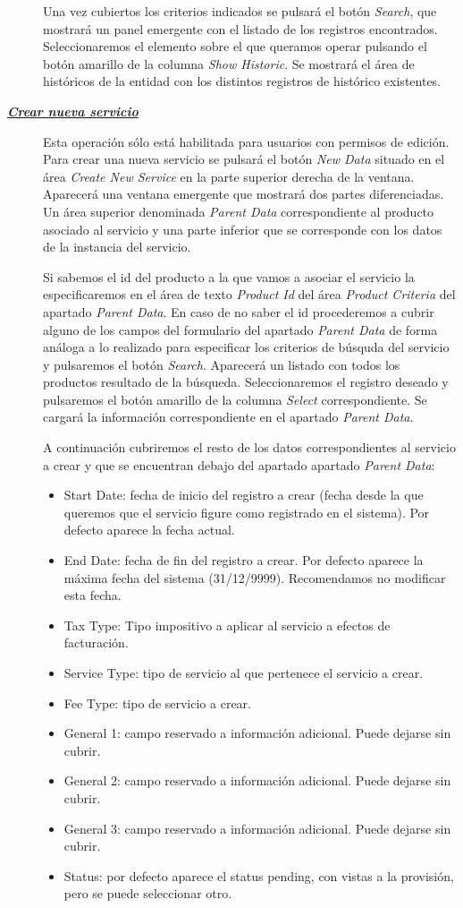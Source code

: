 \begin{description}
Una vez cubiertos los criterios indicados se pulsará el botón \emph{Search}, que mostrará un panel emergente con el listado de los registros encontrados. Seleccionaremos el elemento sobre el que queramos operar pulsando el botón amarillo de la columna \emph{Show Historic}. Se mostrará el área de históricos de la entidad con los distintos registros de histórico existentes.

\item[\underline{\textsl{\textbf{Crear nueva servicio}}}] Esta operación sólo está habilitada para usuarios con permisos de edición.
Para crear una nueva servicio se pulsará el botón \textit{New Data} situado en el área \emph{Create New Service} en la parte superior derecha de la ventana. Aparecerá una ventana emergente que mostrará dos partes diferenciadas. Un área superior denominada \emph{Parent Data} correspondiente al producto asociado al servicio y una parte inferior que se corresponde con los datos de la instancia del servicio.

Si sabemos el id del producto a la que vamos a asociar el servicio la especificaremos en el área de texto \emph{Product Id} del área \emph{Product Criteria} del apartado \emph{Parent Data}. En caso de no saber el id procederemos a cubrir alguno de los campos del formulario del apartado \emph{Parent Data} de forma análoga a lo realizado para especificar los criterios de búsquda del servicio y pulsaremos el botón \emph{Search}. Aparecerá un listado con todos los productos resultado de la búsqueda. Seleccionaremos el registro deseado y pulsaremos el botón amarillo de la columna \emph{Select} correspondiente. Se cargará la información correspondiente en el apartado \emph{Parent Data}.

A continuación cubriremos el resto de los datos correspondientes al servicio a crear y que se encuentran debajo del apartado apartado \emph{Parent Data}:
\begin{itemize}
	\item Start Date: fecha de inicio del registro a crear (fecha desde la que queremos que el servicio figure como registrado en el sistema). Por defecto aparece la fecha actual.
	\item End Date: fecha de fin del registro a crear. Por defecto aparece la máxima fecha del sistema (31/12/9999). Recomendamos no modificar esta fecha.
	\item Tax Type: Tipo impositivo a aplicar al servicio a efectos de facturación.
	\item Service Type: tipo de servicio al que pertenece el servicio a crear.	
		\item Fee Type: tipo de servicio a crear. 
	\item General 1: campo reservado a información adicional. Puede dejarse sin cubrir.
	\item General 2: campo reservado a información adicional. Puede dejarse sin cubrir.
	\item General 3: campo reservado a información adicional. Puede dejarse sin cubrir.
	\item Status: por defecto aparece el status pending, con vistas a la provisión, pero se puede seleccionar otro.
\end{itemize}


\end{description}
